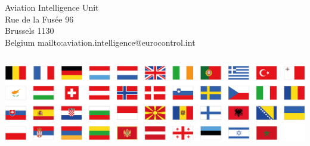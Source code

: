 
\cleardoubleevenemptypage %

\thispagestyle{empty}


\vspace*{\fill}

\vspace*{5cm}

\sffamily
Aviation Intelligence Unit\\
Rue de la Fusée 96\\
Brussels 1130\\
Belgium
mailto:aviation.intelligence@eurocontrol.int\par\bigskip


\vspace*{2cm}


\includegraphics[height=41.49mm]{media/eurocontrol_flags}\par


\restoregeometry
